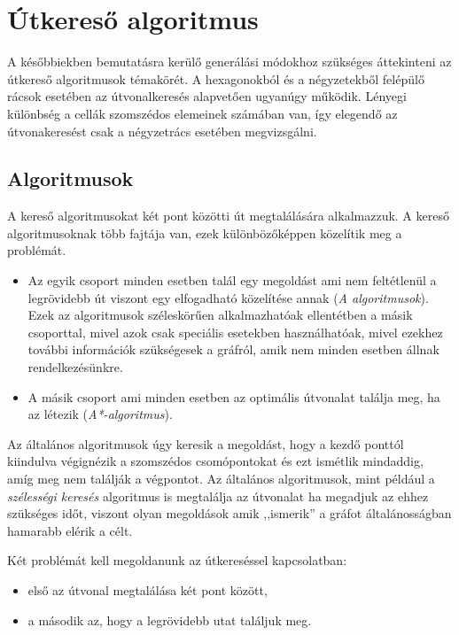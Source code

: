\chapter{Útkereső algoritmus}

A későbbiekben bemutatásra kerülő generálási módokhoz szükséges áttekinteni az útkereső algoritmusok témakörét. A hexagonokból és a négyzetekből felépülő rácsok esetében az útvonalkeresés alapvetően ugyanúgy működik. Lényegi különbség a cellák szomszédos elemeinek számában van, így elegendő az útvonakeresést csak a négyzetrács esetében megvizsgálni.

\section{Algoritmusok}
\cite{algoritmusok}
\cite{redblobA*}
\cite{Dijkstra}
\cite{Pathfinding}
\cite{A*}
\cite{Breadth-first_search}

A kereső algoritmusokat két pont közötti út megtalálására alkalmazzuk. 
A kereső algoritmusoknak több fajtája van, ezek különbözőképpen közelítik meg a problémát. 
\begin{itemize}
\item Az egyik csoport minden esetben talál egy megoldást ami nem feltétlenül a legrövidebb út viszont egy elfogadható közelítése annak (\textit{A algoritmusok}). Ezek az algoritmusok széleskörűen alkalmazhatóak ellentétben a másik csoporttal, mivel azok csak speciális esetekben használhatóak, mivel ezekhez további információk szükségesek a gráfról, amik nem minden esetben állnak rendelkezésünkre.
\item A másik csoport ami minden esetben az optimális útvonalat találja meg, ha az létezik (\textit{A*-algoritmus}).
\end{itemize}

Az általános algoritmusok úgy keresik a megoldást, hogy a kezdő ponttól kiindulva végignézik a szomszédos csomópontokat és ezt ismétlik mindaddig, amíg meg nem találják a végpontot. Az általános algoritmusok, mint például a \textit{szélességi keresés} algoritmus is megtalálja az útvonalat ha megadjuk az ehhez szükséges időt, viszont olyan megoldások amik ,,ismerik'' a gráfot általánosságban hamarabb elérik a célt.

Két problémát kell megoldanunk az útkereséssel kapcsolatban: 
\begin{itemize}
\item első az útvonal megtalálása két pont között, 
\item a második az, hogy a legrövidebb utat találjuk meg. 
\end{itemize}

